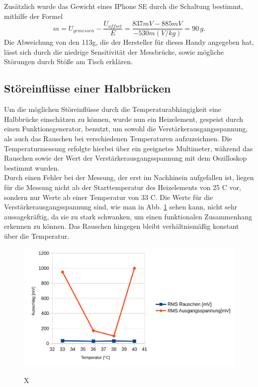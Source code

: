 Zusätzlich wurde das Gewicht eines IPhone SE durch die Schaltung bestimmt, mithilfe der Formel
\begin{equation}
	m=U_{gemessen}-\frac{U_{offset}}{E}=\frac{837mV-885mV}{-530m(V/kg)}=90\,g.
\end{equation}
Die Abweichung von den 113g, die der Hersteller für dieses Handy angegeben hat, lässt sich durch die niedrige Sensitivität der Messbrücke, sowie mögliche Störungen durch Stöße am Tisch erklären.

\subsection{Störeinflüsse einer Halbbrücken}
Um die möglichen Störeinflüsse durch die Temperaturabhängigkeit eine Halbbrücke einschätzen zu können, wurde nun ein Heizelement, gespeist durch einen Funktionsgenerator, benutzt, um sowohl die Verstärkerausgangsspannung, als auch das Rauschen bei verschiedenen Temperaturen aufzuzeichnen. Die Temperaturmessung erfolgte hierbei über ein geeignetes Multimeter, während das Rauschen sowie der Wert der Verstärkerausgangsspannung mit dem Oszilloskop bestimmt wurden. \\
Durch einen Fehler bei der Messung, der erst im Nachhinein aufgefallen ist, liegen für die Messung nicht ab der Starttemperatur des Heizelements von 25 C vor, sondern nur Werte ab einer Temperatur von 33  C. Die Werte für die Verstärkerausgangsspannung sind, wie man in Abb. \ref{fig:temp_mb} sehen kann, nicht sehr aussagekräftig, da sie zu stark schwanken, um einen funktionalen Zusammenhang erkennen zu können. Das Rauschen hingegen bleibt verhältnismäßig konstant über die Temperatur.
\begin{figure}[H]
	\includegraphics[width=\textwidth]{./img/ch3/TemperaturmessungHalbbruecke_3_3_2.png}
	\label{fig:temp_mb}
	\caption{X}
\end{figure}

